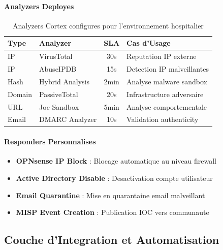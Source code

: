 \paragraph{Analyzers Deployes}
\begin{table}[H]
    \centering
    \caption{Analyzers Cortex configures pour l'environnement hospitalier}
    \begin{tabular}{|l|l|c|l|}
        \hline
        \textbf{Type} & \textbf{Analyzer} & \textbf{SLA} & \textbf{Cas d'Usage}       \\
        \hline
        IP            & VirusTotal        & 30s          & Reputation IP externe      \\
        \hline
        IP            & AbuseIPDB         & 15s          & Detection IP malveillantes \\
        \hline
        Hash          & Hybrid Analysis   & 2min         & Analyse malware sandbox    \\
        \hline
        Domain        & PassiveTotal      & 20s          & Infrastructure adversaire  \\
        \hline
        URL           & Joe Sandbox       & 5min         & Analyse comportementale    \\
        \hline
        Email         & DMARC Analyzer    & 10s          & Validation authenticity    \\
        \hline
    \end{tabular}
\end{table}

\paragraph{Responders Personnalises}
\begin{itemize}
    \item \textbf{OPNsense IP Block} : Blocage automatique au niveau firewall
    \item \textbf{Active Directory Disable} : Desactivation compte utilisateur
    \item \textbf{Email Quarantine} : Mise en quarantaine email malveillant
    \item \textbf{MISP Event Creation} : Publication IOC vers communaute
\end{itemize}

\subsection{Couche d'Integration et Automatisation}

